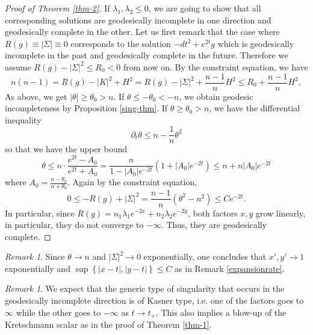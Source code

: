 \documentclass[a4paper,10pt]{article}
\theoremstyle{plain}
\theoremstyle{definition}
\theoremstyle{remark}
\newtheorem{rem}[thm]{Remark}
\theoremstyle{plain}
\newcommand{\eq}[1]{\begin{equation}#1\end{equation}}
\numberwithin{equation}{section}
\begin{document}
\begin{proof}[Proof of Theorem \ref{thm-2}]

If $\lambda_1,\lambda_2\leq 0$, we are going to show that all corresponding solutions are geodesically incomplete in one direction and geodesically complete in the other.
	Let us first remark that the case where $R(g)\equiv |\Sigma|\equiv 0$ corresponds to the solution $-dt^2+e^{2t}g$ which is geodesically incomplete in the past and geodesically complete in the future. Therefore we assume $R(g)-|\Sigma|^2\leq R_0<0$ from now on.
		 By the constraint equation, we have 
		\eq{n(n-1)=R(g)-|K|^2+H^2=R(g)-|\Sigma|^2+\frac{n-1}{n}H^2\leq R_0+ \frac{n-1}{n}H^2,}
		As above, we get $|\theta|\geq \theta_0>n$. If $\theta\leq-\theta_0<-n$, we obtain geodesic incompleteness by Proposition \ref{sing-thm}. If $\theta\geq\theta_0>n$, we have the differential inequality
			\eq{ \partial_t \theta\leq n-\frac{1}{n}\theta^2}
	so that we have the upper bound
			\eq{\theta \leq n\cdot\frac{e^{2t}-A_0}{e^{2t}+A_0}= \frac{n}{1-|A_0|e^{-2t}}(1+|A_0|e^{-2t})\leq n+n|A_0|e^{-2t}}
		where $A_0=\frac{n-\theta_0}{n+\theta_0}$. Again by the constraint equation,
		\eq{0\leq-R(g)+|\Sigma|^2= \frac{n-1}{n}(\theta^2-n^2)\leq Ce^{-2t}. }
		In particular, since $R(g)=n_1\lambda_1e^{-2x}+n_2\lambda_2 e^{-2y}$, both factors $x,y$ grow linearly, in particular, they do not converge to $-\infty$. Thus, they are geodesically complete.\end{proof}
		\begin{rem}
			Since $\theta\to n$ and $ |\Sigma|^2\to 0$ exponentially, one concludes that $x',y'\to 1$ exponentially and $\sup \left\{|x-t|,|y-t|\right\}\leq C$ as in Remark \ref{expansionrate}.
		\end{rem}
		\begin{rem}
			We expect that the generic type of singularity that occurs in the geodesically incomplete direction is of Kasner type, i.e. one of the factors goes to $\infty$ while the other goes to $-\infty$ as $t\to t_+$. This also implies a blow-up of the Kretschmann scalar as in the proof of Theorem \ref{thm-1}.
		\end{rem}
\end{document}

